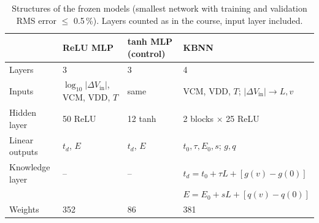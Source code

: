 \begin{table}[t]
\centering
\caption{Structures of the frozen models (smallest network with training and validation RMS error $\le$ 0.5\,\%). Layers counted as in the course, input layer included.}
\label{tab:models}
\small
\begin{tabular}{llll}
\toprule
 & ReLU MLP & tanh MLP (control) & KBNN \\
\midrule
Layers & 3 & 3 & 4 \\
Inputs & $\log_{10}|\Delta V_\text{in}|$, VCM, VDD, $T$ & same & VCM, VDD, $T$; $|\Delta V_\text{in}|\to L, v$ \\
Hidden layer & 50 ReLU & 12 tanh & 2 blocks $\times$ 25 ReLU \\
Linear outputs & $t_d$, $E$ & $t_d$, $E$ & $t_0, \tau, E_0, s$; $g, q$ \\
Knowledge layer & -- & -- & $t_d = t_0 + \tau L + [g(v) - g(0)]$ \\
 &  &  & $E = E_0 + s L + [q(v) - q(0)]$ \\
Weights & 352 & 86 & 381 \\
\bottomrule
\end{tabular}
\par{}
\end{table}

